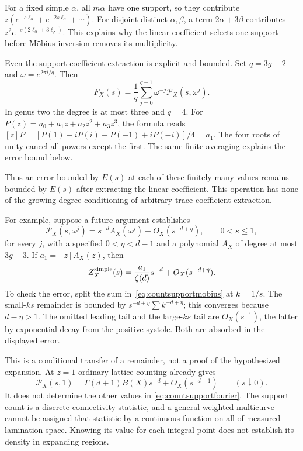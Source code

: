 For a fixed simple $\alpha$, all $m\alpha$ have one support,
so they contribute $z(e^{-s\ell_\alpha}+e^{-2s\ell_\alpha}+\cdots)$.
For disjoint distinct $\alpha,\beta$, a term $2\alpha+3\beta$
contributes $z^2e^{-s(2\ell_\alpha+3\ell_\beta)}$.
This explains why the linear coefficient selects one support
before M\"obius inversion removes its multiplicity.

Even the support-coefficient extraction is explicit and bounded.
Set $q=3g-2$ and $\omega=e^{2\pi i/q}$. Then
\begin{equation}
 F_X(s)=\frac1q\sum_{j=0}^{q-1}
                 \omega^{-j}\mathcal P_X(s,\omega^j).
 \label{eq:countsupportfourier}
\end{equation}
In genus two the degree is at most three and $q=4$.
For $P(z)=a_0+a_1z+a_2z^2+a_3z^3$, the formula reads
$[z]P=[P(1)-iP(i)-P(-1)+iP(-i)]/4=a_1$.
The four roots of unity cancel all powers except the first.
The same finite averaging explains the error bound below.

Thus an error bounded by $E(s)$ at each of these finitely many
values remains bounded by $E(s)$ after extracting the linear
coefficient. This operation has none of the growing-degree
conditioning of arbitrary trace-coefficient extraction.

For example, suppose a future argument establishes
\[
 \mathcal P_X(s,\omega^j)
 =s^{-d}A_X(\omega^j)+O_X(s^{-d+\eta}),
 \qquad 0<s\leq1,
\]
for every $j$, with a specified $0<\eta<d-1$ and a polynomial
$A_X$ of degree at most $3g-3$. If $a_1=[z]A_X(z)$, then
\begin{equation}
 Z_X^{\rm simple}(s)
 =\frac{a_1}{\zeta(d)}s^{-d}+O_X(s^{-d+\eta}).
 \label{eq:countsupportconditional}
\end{equation}
To check the error, split the sum in~\eqref{eq:countsupportmobius}
at $k=1/s$. The small-$ks$ remainder is bounded by
$s^{-d+\eta}\sum k^{-d+\eta}$; this converges because
$d-\eta>1$. The omitted leading tail and the large-$ks$ tail
are $O_X(s^{-1})$, the latter by exponential decay from the
positive systole. Both are absorbed in the displayed error.

This is a conditional transfer of a remainder, not a proof of
the hypothesized expansion. At $z=1$ ordinary lattice counting
already gives
\[
 \mathcal P_X(s,1)
 =\Gamma(d+1)B(X)s^{-d}+O_X(s^{-d+1})
 \qquad(s\downarrow0).
\]
It does not determine the other values in
\eqref{eq:countsupportfourier}. The support count is a discrete
connectivity statistic, and a general weighted multicurve cannot
be assigned that statistic by a continuous function on all of
measured-lamination space. Knowing its value for each integral
point does not establish its density in expanding regions.

